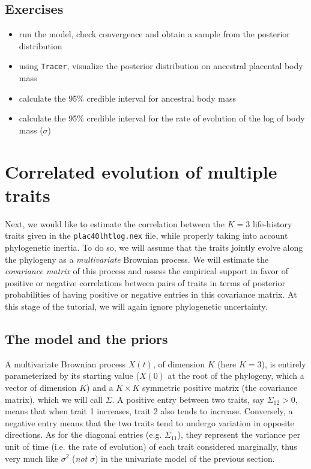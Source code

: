 \documentclass[usletter]{article}
\newcommand{\cmd}[1]{\texttt{#1}}
\begin{document}
\subsection*{Exercises}

\begin{itemize}
\item
run the model, check convergence and obtain a sample from the posterior distribution
\item
using \cmd{Tracer}, visualize the posterior distribution on ancestral placental body mass
\item
calculate the 95\% credible interval for ancestral body mass
\item
calculate the 95\% credible interval for the rate of evolution of the log of body mass ($\sigma$)
\end{itemize}



\section{Correlated evolution of multiple traits}
\label{multivariate}

Next, we would like to estimate the correlation between the $K=3$ life-history traits given in the \cmd{plac40lhtlog.nex} file, while properly taking into account phylogenetic inertia. 
To do so, we will assume that the traits jointly evolve along the phylogeny as a \emph{multivariate} Brownian process.
We will estimate the \emph{covariance matrix} of this process and assess the empirical support in favor of positive or negative correlations between pairs of traits in terms of posterior probabilities of having positive or negative entries in this covariance matrix.
At this stage of the tutorial, we will again ignore phylogenetic uncertainty.

\subsection*{The model and the priors}

A multivariate Brownian process $X(t)$, of dimension $K$ (here $K=3$),
is entirely parameterized by its starting value ($X(0)$ at the root of the phylogeny, which a vector of dimension $K$) and a $K \times K$ symmetric positive matrix (the covariance matrix), which we will call $\Sigma$.
A positive entry between two traits, say $\Sigma_{12} > 0$, means that when trait 1 increases, trait 2 also tends to increase. Conversely, a negative entry means that the two traits tend to undergo variation in opposite directions.
As for the diagonal entries (e.g. $\Sigma_{11}$), they represent the variance per unit of time (i.e. the rate of evolution) of each trait considered marginally,
thus very much like $\sigma^2$ (\emph{not} $\sigma$) in the univariate model of the previous section.
\end{document}
